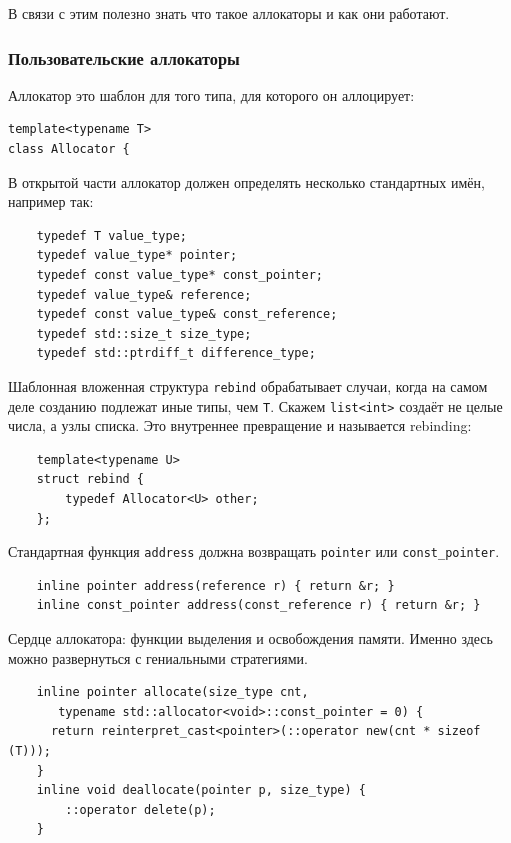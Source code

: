 \documentclass[a4paper,12pt,oneside]{article}
\begin{document}
В связи с этим полезно знать что такое аллокаторы и как они работают.

\subsubsection{Пользовательские аллокаторы}

Аллокатор это шаблон для того типа, для которого он аллоцирует:

\begin{lstlisting}
template<typename T>
class Allocator {
\end{lstlisting}

В открытой части аллокатор должен определять несколько стандартных имён, например так:

\begin{lstlisting}
    typedef T value_type;
    typedef value_type* pointer;
    typedef const value_type* const_pointer;
    typedef value_type& reference;
    typedef const value_type& const_reference;
    typedef std::size_t size_type;
    typedef std::ptrdiff_t difference_type;
\end{lstlisting}

Шаблонная вложенная структура \lstinline!rebind! обрабатывает случаи, когда на самом деле созданию подлежат иные типы, чем \lstinline!T!. Скажем \lstinline!list<int>! создаёт не целые числа, а узлы списка. Это внутреннее превращение и называется rebinding:

\begin{lstlisting}
    template<typename U>
    struct rebind {
        typedef Allocator<U> other;
    };
\end{lstlisting}

Стандартная функция \lstinline!address! должна возвращать \lstinline!pointer! или \lstinline!const_pointer!.

\begin{lstlisting}
    inline pointer address(reference r) { return &r; }
    inline const_pointer address(const_reference r) { return &r; }
\end{lstlisting}

Сердце аллокатора: функции выделения и освобождения памяти. Именно здесь можно развернуться с гениальными стратегиями.

\begin{lstlisting}
    inline pointer allocate(size_type cnt, 
       typename std::allocator<void>::const_pointer = 0) { 
      return reinterpret_cast<pointer>(::operator new(cnt * sizeof (T))); 
    }
    inline void deallocate(pointer p, size_type) { 
        ::operator delete(p); 
    }
\end{lstlisting}
\end{document}
